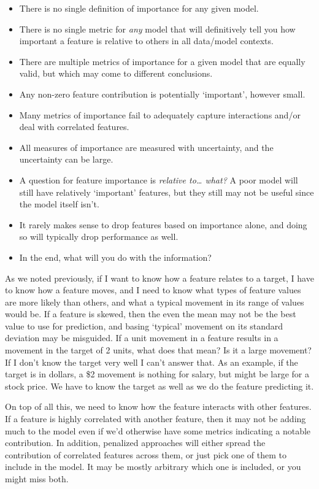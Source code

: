 \documentclass[
  letterpaper,
]{krantz}
\providecommand{\tightlist}{%
  \setlength{\itemsep}{0pt}\setlength{\parskip}{0pt}}\usepackage{longtable,booktabs,array}
\begin{document}
\begin{itemize}
\tightlist
\item
  There is no single definition of importance for any given model.
\item
  There is no single metric for \emph{any} model that will definitively
  tell you how important a feature is relative to others in all
  data/model contexts.
\item
  There are multiple metrics of importance for a given model that are
  equally valid, but which may come to different conclusions.
\item
  Any non-zero feature contribution is potentially `important', however
  small.
\item
  Many metrics of importance fail to adequately capture interactions
  and/or deal with correlated features.
\item
  All measures of importance are measured with uncertainty, and the
  uncertainty can be large.
\item
  A question for feature importance is \emph{relative to\ldots{} what?}
  A poor model will still have relatively `important' features, but they
  still may not be useful since the model itself isn't.
\item
  It rarely makes sense to drop features based on importance alone, and
  doing so will typically drop performance as well.
\item
  In the end, what will you do with the information?
\end{itemize}

As we noted previously, if I want to know how a feature relates to a
target, I have to know how a feature moves, and I need to know what
types of feature values are more likely than others, and what a typical
movement in its range of values would be. If a feature is skewed, then
the even the mean may not be the best value to use for prediction, and
basing `typical' movement on its standard deviation may be misguided. If
a unit movement in a feature results in a movement in the target of 2
units, what does that mean? Is it a large movement? If I don't know the
target very well I can't answer that. As an example, if the target is in
dollars, a \$2 movement is nothing for salary, but might be large for a
stock price. We have to know the target as well as we do the feature
predicting it.

On top of all this, we need to know how the feature interacts with other
features. If a feature is highly correlated with another feature, then
it may not be adding much to the model even if we'd otherwise have some
metrics indicating a notable contribution. In addition, penalized
approaches will either spread the contribution of correlated features
across them, or just pick one of them to include in the model. It may be
mostly arbitrary which one is included, or you might miss both.
\end{document}
